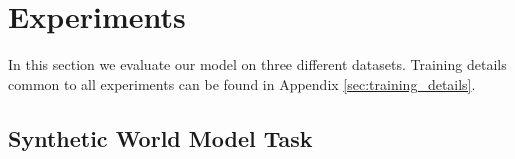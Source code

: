\documentclass{article} \usepackage{iclr2016_conference,times}
\begin{document}
\begin{comment}
Finally an improved DNC model was introduced in \cite{graves2016hybrid}
and has proven effective at learning simple algorithmic tasks, in addition to
 more complex question-answering and spatial reasoning tasks.
In order to do this the model has been complexified further, for example by incorporating
free gates so that locations that have already been written can be reused,
and a temporal link matrix so that the order of memory writes can be controlled.

Although our model shares several properties with the DNC class of models, such as a fixed sized 
updatable memory and a sequential processing of the input, it also has important architectural differences. The DNC has a relatively sophisticated controller network (such as a Long short-term Memory (LSTM) network) which reads an input and outputs a number of interface vectors (such as keys and weightings) which are then combined to read from and write to the external memory matrix. 
In contrast, our model can be viewed as a set of separate recurrent models whose hidden states store the memory slots. These hidden states are either fixed by the gates, or modified through a simple RNN-style update. The bulk of the reasoning is thus performed by these parallel recurrent models, rather than through a central controller. 


Finally, other than the two families described above, 
there are also other recent models that are related
 but don't quite fit into either class.
Those include the Neural Reasoner \citep{peng2015towards},
and work on using a stack as an 
external memory \citep{joulin2015inferring, grefenstette2015learning}
 rather than an array as in other works.


\end{comment}





\section{Experiments}

In this section we evaluate our model on three different datasets. 
Training details common to all experiments can be found in Appendix \ref{sec:training_details}.

\subsection{Synthetic World Model Task}
\end{document}
